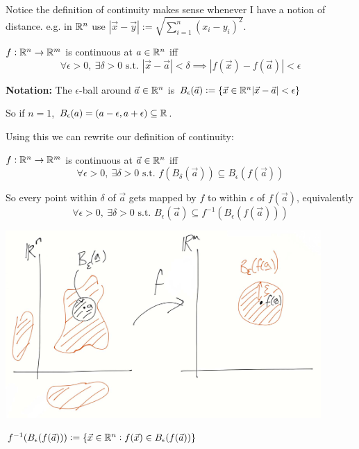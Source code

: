 Notice 
 the definition of continuity makes sense whenever I have a notion of distance.  e.g. in $\mathbb{R}^n$ use $|\vec{x} - \vec{y}| := \sqrt{\sum_{i=1}^n (x_i - y_i)^2}$.\\

\begin{definition}
$f: \mathbb{R}^n \to \mathbb{R}^m$ is continuous at $a \in \mathbb{R}^n$ iff 
\[\forall \epsilon >0,~\exists \delta >0 \text{ s.t. } |\vec{x} - \vec{a}| < \delta \implies |f(\vec{x}) - f(\vec{a})| < \epsilon\]	
\end{definition}

\textbf{Notation:} The $\epsilon$-ball around $\vec{a}\in\mathbb{R}^n$ is $B_\epsilon(\vec{a}) := \{\vec{x} \in \mathbb{R}^n |\vec{x} - \vec{a}| < \epsilon\}$

So if $n = 1$, $B_\epsilon(a) = (a-\epsilon, a + \epsilon) \subseteq \mathbb{R}$. 

Using this we can rewrite our definition of continuity:\\

\begin{definition}
$f: \mathbb{R}^n \to \mathbb{R}^m$ is continuous at $\vec{a} \in \mathbb{R}^n$ iff 
\[\forall \epsilon > 0,~\exists \delta > 0 \text{ s.t. } f(B_\delta(\vec{a})) \subseteq B_\epsilon(f(\vec{a}))\]	
\end{definition}

So every point within $\delta$ of $\vec{a}$ gets mapped by $f$ to within $\epsilon$ of $f(\vec{a})$, equivalently 
\[\boxed{\forall \epsilon > 0,~\exists \delta > 0 \text{ s.t. } B_\epsilon(\vec{a}) \subseteq f^{-1}(B_\epsilon(f(\vec{a})))}\]


\begin{center}
\includegraphics[width = 12cm]{ball1.jpg}
\end{center}


$f^{-1}(B_\epsilon(f(\vec{a}))) := \{\vec{x} \in \mathbb{R}^n : f(\vec{x}) \in B_\epsilon (f(\vec{a}))\}$

